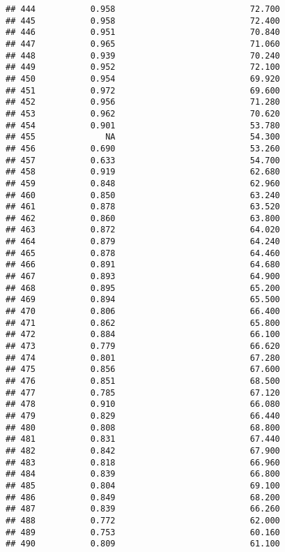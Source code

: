 \documentclass[
]{article}
\begin{document}
\begin{verbatim}
## 444           0.958                           72.700
## 445           0.958                           72.400
## 446           0.951                           70.840
## 447           0.965                           71.060
## 448           0.939                           70.240
## 449           0.952                           72.100
## 450           0.954                           69.920
## 451           0.972                           69.600
## 452           0.956                           71.280
## 453           0.962                           70.620
## 454           0.901                           53.780
## 455              NA                           54.300
## 456           0.690                           53.260
## 457           0.633                           54.700
## 458           0.919                           62.680
## 459           0.848                           62.960
## 460           0.850                           63.240
## 461           0.878                           63.520
## 462           0.860                           63.800
## 463           0.872                           64.020
## 464           0.879                           64.240
## 465           0.878                           64.460
## 466           0.891                           64.680
## 467           0.893                           64.900
## 468           0.895                           65.200
## 469           0.894                           65.500
## 470           0.806                           66.400
## 471           0.862                           65.800
## 472           0.884                           66.100
## 473           0.779                           66.620
## 474           0.801                           67.280
## 475           0.856                           67.600
## 476           0.851                           68.500
## 477           0.785                           67.120
## 478           0.910                           66.080
## 479           0.829                           66.440
## 480           0.808                           68.800
## 481           0.831                           67.440
## 482           0.842                           67.900
## 483           0.818                           66.960
## 484           0.839                           66.800
## 485           0.804                           69.100
## 486           0.849                           68.200
## 487           0.839                           66.260
## 488           0.772                           62.000
## 489           0.753                           60.160
## 490           0.809                           61.100

\end{verbatim}
\end{document}

